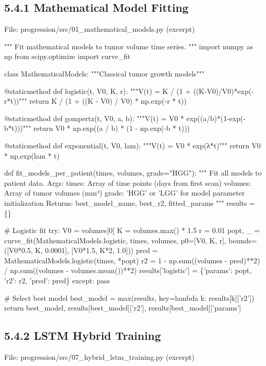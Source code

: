 \subsection{5.4.1 Mathematical Model Fitting}
File: progression/src/01\_mathematical\_models.py (excerpt)

"""
Fit mathematical models to tumor volume time series.
"""
import numpy as np
from scipy.optimize import curve\_fit

class MathematicalModels:
    """Classical tumor growth models"""
    
    @staticmethod
    def logistic(t, V0, K, r):
        """V(t) = K / (1 + ((K-V0)/V0)*exp(-r*t))"""
        return K / (1 + ((K - V0) / V0) * np.exp(-r * t))
    
    @staticmethod
    def gompertz(t, V0, a, b):
        """V(t) = V0 * exp((a/b)*(1-exp(-b*t)))"""
        return V0 * np.exp((a / b) * (1 - np.exp(-b * t)))
    
    @staticmethod
    def exponential(t, V0, lam):
        """V(t) = V0 * exp(λ*t)"""
        return V0 * np.exp(lam * t)

def fit\_models\_per\_patient(times, volumes, grade="HGG"):
    """
    Fit all models to patient data.
    Args:
        times: Array of time points (days from first scan)
        volumes: Array of tumor volumes (mm³)
        grade: 'HGG' or 'LGG' for model parameter initialization
    Returns:
        best\_model\_name, best\_r2, fitted\_params
    """
    results = \{\}
    
    \# Logistic fit
    try:
        V0 = volumes[0]
        K = volumes.max() * 1.5
        r = 0.01
        popt, \_ = curve\_fit(MathematicalModels.logistic, 
                           times, volumes,
                           p0=[V0, K, r],
                           bounds=([V0*0.5, K, 0.0001], 
                                   [V0*1.5, K*2, 1.0]))
        pred = MathematicalModels.logistic(times, *popt)
        r2 = 1 - np.sum((volumes - pred)**2) / np.sum((volumes - volumes.mean())**2)
        results['logistic'] = \{'params': popt, 'r2': r2, 'pred': pred\}
    except:
        pass
    
    \# Select best model
    best\_model = max(results, key=lambda k: results[k]['r2'])
    return best\_model, results[best\_model]['r2'], results[best\_model]['params']


\subsection{5.4.2 LSTM Hybrid Training}
File: progression/src/07\_hybrid\_lstm\_training.py (excerpt)

